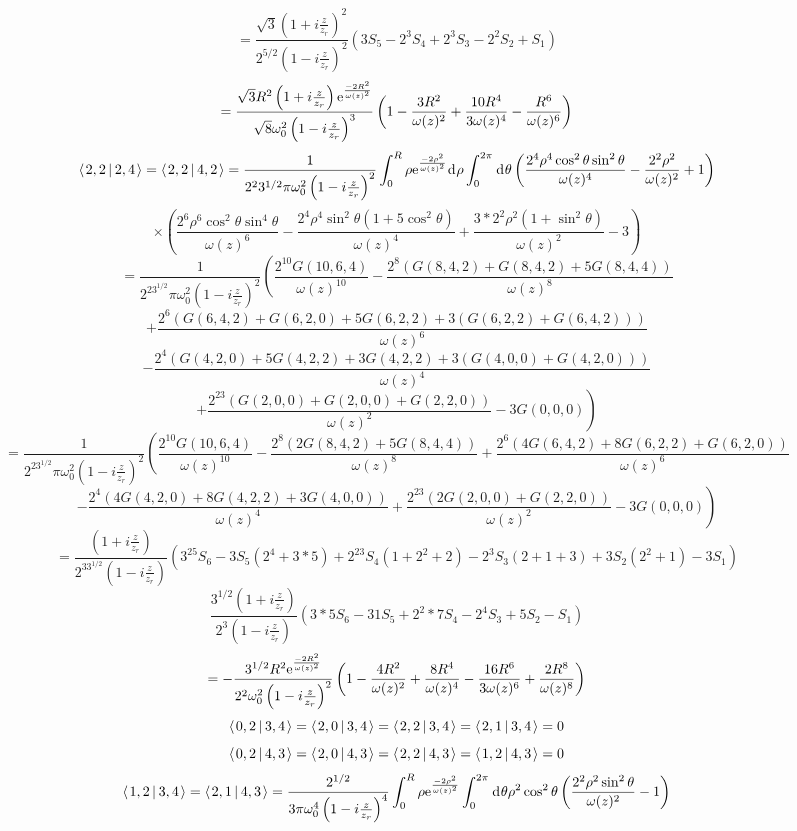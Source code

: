 \documentclass[11pt]{amsart}
\makeatletter
\newcommand{\e}{{\rm e}}				%
\newcommand{\msp}[1]{\mspace{#1mu}}		%
\newcommand{\0}{\varnothing}		%
\newcommand{\dd}{\msp{1} {\rm{d}} \msp{1}}	%
\newcommand{\brac}[2]{\left\langle\msp{2} #1\left\lvert \msp{3.5} #2 \right.\right\rangle}	%
\newcommand{\1}{!}
\newcommand{\2}{@}
\newcommand{\3}{\#}
\newcommand{\4}{\$}
\newcommand{\5}{\%}
\newcommand{\6}{$^\wedge$}
\newcommand{\7}{\&}
\newcommand{\8}{*}
\newcommand{\9}{(}
\makeatother
\begin{document}
\[
=\frac{\sqrt{3}\left(1+i\frac{z}{z_r}\right)^2}{2^{5/2}\left(1-i\frac{z}{z_r}\right)^2}\left(3S_5-2^3S_4+2^3S_3-2^2S_2+S_1\right)
\]
\[
=\frac{\sqrt{3}R^2\left(1+i\frac{z}{z_r}\right)\e^{\frac{-2R^2}{\omega(z)^2}}}{\sqrt{8}\omega_0^2\left(1-i\frac{z}{z_r}\right)^3}\left(1-\frac{3R^2}{\omega(z)^2}+\frac{10R^4}{3\omega(z)^4}-\frac{R^6}{\omega(z)^6}\right)
\]
\[
\brac{2,2}{2,4} = \brac{2,2}{4,2} = \frac{1}{2^23^{1/2}\pi\omega_0^2\left(1-i\frac{z}{z_r}\right)^2}\int_0^R\rho \e^{\frac{-2\rho^2}{\omega(z)^2}}\dd \rho \int_0^{2\pi} \dd \theta\left(\frac{2^4\rho^4\cos^2\theta\sin^2\theta}{\omega(z)^4}-\frac{2^2\rho^2}{\omega(z)^2}+1\right)
\]
\[
\times\left(\frac{2^6\rho^6\cos^2\theta\sin^4\theta}{\omega(z)^6}-\frac{2^4\rho^4\sin^2\theta\left(1+5\cos^2\theta\right)}{\omega(z)^4}+\frac{3*2^2\rho^2\left(1+\sin^2\theta\right)}{\omega(z)^2}-3\right)
\]
\[
= \frac{1}{2^23^{1/2}\pi\omega_0^2\left(1-i\frac{z}{z_r}\right)^2}\left(\frac{2^{10}G(10,6,4)}{\omega(z)^{10}}-\frac{2^8\left(G(8,4,2)+G(8,4,2)+5G(8,4,4)\right)}{\omega(z)^8}\right.
\]
\[
\left.+\frac{2^6\left(G(6,4,2)+G(6,2,0)+5G(6,2,2)+3(G(6,2,2)+G(6,4,2))\right)}{\omega(z)^6}\right.
\]
\[
\left.-\frac{2^4\left(G(4,2,0)+5G(4,2,2)+3G(4,2,2)+3\left(G(4,0,0)+G(4,2,0)\right)\right)}{\omega(z)^4}\right.
\]
\[
\left.+\frac{2^23\left(G(2,0,0)+G(2,0,0)+G(2,2,0)\right)}{\omega(z)^2}-3G(0,0,0)\right)
\]
\[
=\frac{1}{2^23^{1/2}\pi \omega_0^2\left(1-i\frac{z}{z_r}\right)^2}\left(\frac{2^{10}G(10,6,4)}{\omega(z)^{10}}-\frac{2^8\left(2G(8,4,2)+5G(8,4,4)\right)}{\omega(z)^8}+\frac{2^6\left(4G(6,4,2)+8G(6,2,2)+G(6,2,0)\right)}{\omega(z)^6}\right.
\]
\[
\left.-\frac{2^4\left(4G(4,2,0)+8G(4,2,2)+3G(4,0,0)\right)}{\omega(z)^4}+\frac{2^23\left(2G(2,0,0)+G(2,2,0)\right)}{\omega(z)^2}-3G(0,0,0)\right)
\]
\[
=\frac{\left(1+i\frac{z}{z_r}\right)}{2^33^{1/2}\left(1-i\frac{z}{z_r}\right)}\left(3^25S_6-3S_5\left(2^4+3*5\right)+2^23S_4\left(1+2^2+2\right)-2^3S_3\left(2+1+3\right)+3S_2\left(2^2+1\right)-3S_1\right)
\]
\[
\frac{3^{1/2}\left(1+i\frac{z}{z_r}\right)}{2^3\left(1-i\frac{z}{z_r}\right)}\left(3*5S_6-31S_5+2^2*7S_4-2^4S_3+5S_2-S_1\right)
\]
\[
=-\frac{3^{1/2}R^2\e^{\frac{-2R^2}{\omega(z)^2}}}{2^2\omega_0^2\left(1-i\frac{z}{z_r}\right)^2}\left(1-\frac{4R^2}{\omega(z)^2}+\frac{8R^4}{\omega(z)^4}-\frac{16R^6}{3\omega(z)^6}+\frac{2R^8}{\omega(z)^8}\right)
\]
\[
\brac{0,2}{3,4} = \brac{2,0}{3,4} = \brac{2,2}{3,4} =\brac{2,1}{3,4}= 0
\]
\[
\brac{0,2}{4,3}=\brac{2,0}{4,3}=\brac{2,2}{4,3} =\brac{1,2}{4,3}=0
\]
\[
\brac{1,2}{3,4} = \brac{2,1}{4,3} = \frac{2^{1/2}}{3\pi\omega_0^4\left(1-i\frac{z}{z_r}\right)^4}\int_0^R\rho \e^{\frac{-2\rho^2}{\omega(z)^2}}\int_0^{2\pi}\dd \theta \rho^2\cos^2\theta\left(\frac{2^2\rho^2\sin^2\theta}{\omega(z)^2}-1\right)
\]
\end{document}
